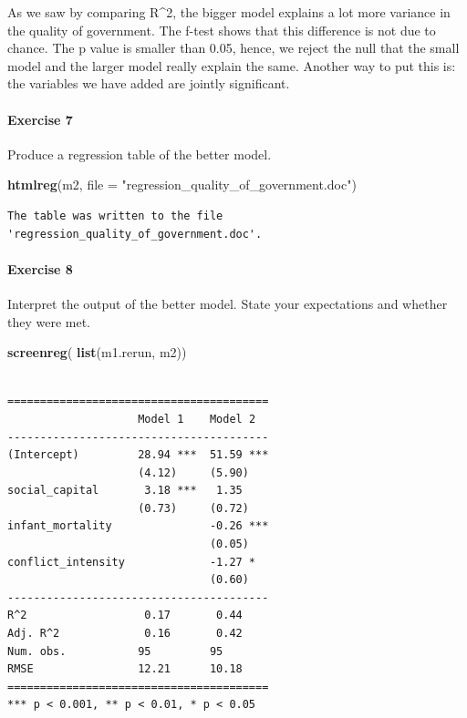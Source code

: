 \documentclass[]{article}
\newenvironment{Shaded}{\begin{snugshade}}{\end{snugshade}}
\newcommand{\KeywordTok}[1]{\textcolor[rgb]{0.13,0.29,0.53}{\textbf{#1}}}
\newcommand{\DataTypeTok}[1]{\textcolor[rgb]{0.13,0.29,0.53}{#1}}
\newcommand{\StringTok}[1]{\textcolor[rgb]{0.31,0.60,0.02}{#1}}
\newcommand{\NormalTok}[1]{#1}
\let\oldparagraph\paragraph
\renewcommand{\paragraph}[1]{\oldparagraph{#1}\mbox{}}
\theoremstyle{definition}
\theoremstyle{definition}
\theoremstyle{definition}
\theoremstyle{remark}
\begin{document}
As we saw by comparing R\^{}2, the bigger model explains a lot more
variance in the quality of government. The f-test shows that this
difference is not due to chance. The p value is smaller than 0.05,
hence, we reject the null that the small model and the larger model
really explain the same. Another way to put this is: the variables we
have added are jointly significant.

\paragraph{Exercise 7}\label{exercise-7-5}

Produce a regression table of the better model.

\begin{Shaded}
\begin{Highlighting}[]
\KeywordTok{htmlreg}\NormalTok{(m2, }\DataTypeTok{file =} \StringTok{"regression_quality_of_government.doc"}\NormalTok{)}
\end{Highlighting}
\end{Shaded}

\begin{verbatim}
The table was written to the file 'regression_quality_of_government.doc'.
\end{verbatim}

\paragraph{Exercise 8}\label{exercise-8-6}

Interpret the output of the better model. State your expectations and
whether they were met.

\begin{Shaded}
\begin{Highlighting}[]
\KeywordTok{screenreg}\NormalTok{( }\KeywordTok{list}\NormalTok{(m1.rerun, m2))}
\end{Highlighting}
\end{Shaded}

\begin{verbatim}

========================================
                    Model 1    Model 2  
----------------------------------------
(Intercept)         28.94 ***  51.59 ***
                    (4.12)     (5.90)   
social_capital       3.18 ***   1.35    
                    (0.73)     (0.72)   
infant_mortality               -0.26 ***
                               (0.05)   
conflict_intensity             -1.27 *  
                               (0.60)   
----------------------------------------
R^2                  0.17       0.44    
Adj. R^2             0.16       0.42    
Num. obs.           95         95       
RMSE                12.21      10.18    
========================================
*** p < 0.001, ** p < 0.01, * p < 0.05
\end{verbatim}
\end{document}
